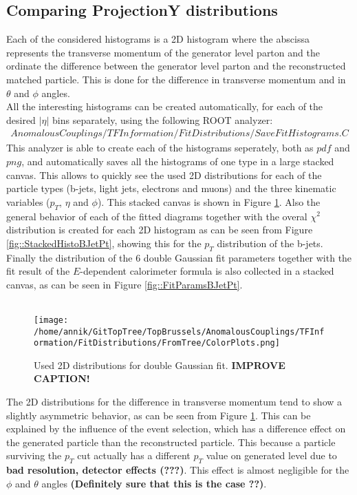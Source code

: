 \subsection{Comparing ProjectionY distributions}\label{subsec::FitRanges}
Each of the considered histograms is a 2D histogram where the abscissa represents the transverse momentum of the generator level parton and the ordinate the difference between the generator level parton and the reconstructed matched particle. This is done for the difference in transverse momentum and in $\theta$ and $\phi$ angles.\\
All the interesting histograms can be created automatically, for each of the desired $\vert \eta \vert$ bins separately, using the following ROOT analyzer:
\begin{eqnarray*}
 AnomalousCouplings/TFInformation/FitDistributions/SaveFitHistograms.C
\end{eqnarray*}
This analyzer is able to create each of the histograms seperately, both as $pdf$ and $png$, and automatically saves all the histograms of one type in a large stacked canvas. This allows to quickly see the used 2D distributions for each of the particle types (b-jets, light jets, electrons and muons) and the three kinematic variables ($p_T$, $\eta$ and $\phi$). This stacked canvas is shown in Figure \ref{fig::ColorPlots}.  Also the general behavior of each of the fitted diagrams together with the overal $\chi^{2}$ distribution is created for each 2D histogram as can be seen from Figure \ref{fig::StackedHistoBJetPt}, showing this for the $p_T$ distribution of the b-jets. Finally the distribution of the $6$ double Gaussian fit parameters together with the fit result of the $E$-dependent calorimeter formula is also collected in a stacked canvas, as can be seen in Figure \ref{fig::FitParamsBJetPt}.\\
\\
\begin{figure}[!h]
  \centering
  \texttt{[image: /home/annik/GitTopTree/TopBrussels/AnomalousCouplings/TFInformation/FitDistributions/FromTree/ColorPlots.png]}
  \caption{Used 2D distributions for double Gaussian fit. \textbf{IMPROVE CAPTION!}} \label{fig::ColorPlots} 
\end{figure}
The 2D distributions for the difference in transverse momentum tend to show a slightly asymmetric behavior, as can be seen from Figure \ref{fig::ColorPlots}. This can be explained by the influence of the event selection, which has a difference effect on the generated particle than the reconstructed particle. This because a particle surviving the $p_T$ cut actually has a different $p_T$ value on generated level due to \textbf{bad resolution, detector effects (???)}. This effect is almost negligible for the $\phi$ and $\theta$ angles \textbf{(Definitely sure that this is the case ??)}.\\
